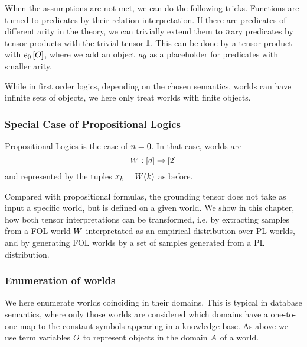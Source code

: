 When the assumptions are not met, we can do the following tricks.
Functions are turned to predicates by their relation interpretation.
If there are predicates of different arity in the theory, we can trivially extend them to $n$ary predicates by tensor products with the trivial tensor $\mathbb{I}$.
This can be done by a tensor product with $e_{0}\left[O\right]$, where we add an object $a_{0}$ as a placeholder for predicates with smaller arity.

While in first order logics, depending on the chosen semantics, worlds can have infinite sets of objects, we here only treat worlds with finite objects.


\subsubsection{Special Case of Propositional Logics}

% 
Propositional Logics is the case of $n=0$.
In that case, worlds are
	\[ W: [d] \rightarrow [2] \]
and represented by the tuples $x_{k} = W(k)$ as before.

Compared with propositional formulas, the grounding tensor does not take as input a specific world, but is defined on a given world.
We show in this chapter, how both tensor interpretations can be transformed, i.e. by extracting samples from a FOL world $W$ interpretated as an empirical distribution over PL worlds, and by generating FOL worlds by a set of samples generated from a PL distribution.


\subsubsection{Enumeration of worlds}


We here enumerate worlds coinciding in their domains. 
This is typical in database semantics, where only those worlds are considered which domains have a one-to-one map to the constant symbols appearing in a knowledge base. %
As above we use term variables $O$ to represent objects in the domain $A$ of a world.

